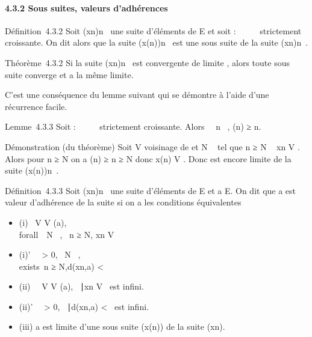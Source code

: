 \paragraph{4.3.2 Sous suites, valeurs d'adhérences}

Définition~4.3.2 Soit (xn)n\in{}~ une suite d'éléments
de E et soit \phi : ~ \rightarrow~ ~ strictement croissante. On dit alors que la suite
(x\phi(n))n\in{}~ est une sous suite de la suite
(xn)n\in{}~.

Théorème~4.3.2 Si la suite (xn)n\in{}~ est convergente
de limite \ell, alors toute sous suite converge et a la même limite.

C'est une conséquence du lemme suivant qui se démontre à l'aide d'une
récurrence facile.

Lemme~4.3.3 Soit \phi : ~ \rightarrow~ ~ strictement croissante. Alors
\forall~~n \in {}~, \phi(n) ≥ n.

Démonstration (du théorème) Soit V voisinage de \ell et N \in {}~ tel que n ≥ N
\rigtharrow~ xn \in V . Alors pour n ≥ N on a \phi(n) ≥ n ≥ N donc
x\phi(n) \in V . Donc \ell est encore limite de la suite
(x\phi(n))n\in{}~.

Définition~4.3.3 Soit (xn)n\in{}~ une suite d'éléments
de E et a \in E. On dit que a est valeur d'adhérence de la suite si on a
les conditions équivalentes

\begin{itemize}
\itemsep1pt\parskip0pt
\item
  (i) \forall~V \in V (a), \\forall~~N
  \in {}~, \exists~n ≥ N,\quad
  xn \in V
\item
  (i)' \forall~~\epsilon \textgreater{} 0,
  \forall~N \in {}~, \\exists~n ≥
  N,\quad d(xn,a) \textless{} \epsilon
\item
  (ii) \forall~~V \in V (a), \n \in
  ~∣xn \in V \ est
  infini.
\item
  (ii)' \forall~~\epsilon \textgreater{} 0,
  \n \in {}~∣d(xn,a)
  \textless{} \epsilon\ est infini.
\item
  (iii) a est limite d'une sous suite (x\phi(n)) de la suite
  (xn).
\end{itemize}

